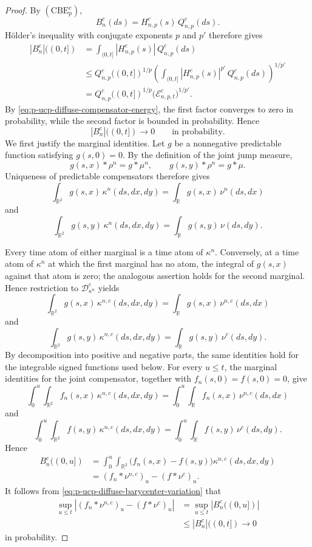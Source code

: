 \documentclass[a4paper,10pt]{article}
\begin{document}
\begin{proof}
By \((\mathrm{CBE}_p^c)\),
\[
        B_n^c(ds)
        =
        H_{n,p}^c(s)\,Q_{n,p}^c(ds).
\]
Hölder's inequality with conjugate exponents \(p\) and \(p'\)
therefore gives
\[
\begin{aligned}
|B_n^c|((0,t])
&=
\int_{(0,t]}
|H_{n,p}^c(s)|\,Q_{n,p}^c(ds)
\\
&\le
Q_{n,p}^c((0,t])^{1/p}
\left(
\int_{(0,t]}
|H_{n,p}^c(s)|^{p'}\,Q_{n,p}^c(ds)
\right)^{1/p'}
\\
&=
Q_{n,p}^c((0,t])^{1/p}
\bigl(\mathcal E_{n,p,t}^c\bigr)^{1/p'}.
\end{aligned}
\]
By \eqref{eq:p-ucp-diffuse-compensator-energy}, the first factor
converges to zero in probability, while the second factor is
bounded in probability. Hence
\begin{equation}
\label{eq:p-ucp-diffuse-barycenter-variation}
        |B_n^c|((0,t])
        \longrightarrow0
        \qquad\text{in probability}.
\end{equation}
We first justify the marginal identities. Let \(g\) be a nonnegative
predictable function satisfying \(g(s,0)=0\). By the definition of the
joint jump measure,
\[
        g(s,x)*\rho^n=g*\mu^n,
        \qquad
        g(s,y)*\rho^n=g*\mu.
\]
Uniqueness of predictable compensators therefore gives
\[
\int_{\mathbb R^2}g(s,x)\,\kappa^n(ds,dx,dy)
=
\int_{\mathbb R}g(s,x)\,\nu^n(ds,dx)
\]
and
\[
\int_{\mathbb R^2}g(s,y)\,\kappa^n(ds,dx,dy)
=
\int_{\mathbb R}g(s,y)\,\nu(ds,dy).
\]

Every time atom of either marginal is a time atom of \(\kappa^n\).
Conversely, at a time atom of \(\kappa^n\) at which the first marginal
has no atom, the integral of \(g(s,x)\) against that atom is zero;
the analogous assertion holds for the second marginal. Hence
restriction to \(\mathcal D_{\kappa^n}^c\) yields
\[
\int_{\mathbb R^2}g(s,x)\,\kappa^{n,c}(ds,dx,dy)
=
\int_{\mathbb R}g(s,x)\,\nu^{n,c}(ds,dx)
\]
and
\[
\int_{\mathbb R^2}g(s,y)\,\kappa^{n,c}(ds,dx,dy)
=
\int_{\mathbb R}g(s,y)\,\nu^c(ds,dy).
\]
By decomposition into positive and negative parts, the same identities
hold for the integrable signed functions used below.
For every \(u\le t\), the marginal identities for the joint
compensator, together with \(f_n(s,0)=f(s,0)=0\), give
\[
\int_0^u\int_{\mathbb R^2}
f_n(s,x)\,\kappa^{n,c}(ds,dx,dy)
=
\int_0^u\int_{\mathbb R}
f_n(s,x)\,\nu^{n,c}(ds,dx)
\]
and
\[
\int_0^u\int_{\mathbb R^2}
f(s,y)\,\kappa^{n,c}(ds,dx,dy)
=
\int_0^u\int_{\mathbb R}
f(s,y)\,\nu^c(ds,dy).
\]
Hence
\[
\begin{aligned}
B_n^c((0,u])
&=
\int_0^u\int_{\mathbb R^2}
\bigl(f_n(s,x)-f(s,y)\bigr)
\kappa^{n,c}(ds,dx,dy)
\\
&=
(f_n*\nu^{n,c})_u-(f*\nu^c)_u.
\end{aligned}
\]
It follows from \eqref{eq:p-ucp-diffuse-barycenter-variation} that
\begin{equation}
\label{eq:p-ucp-diffuse-level-convergence}
\begin{aligned}
\sup_{u\le t}
\left|
(f_n*\nu^{n,c})_u-(f*\nu^c)_u
\right|
&=
\sup_{u\le t}|B_n^c((0,u])|
\\
&\le
|B_n^c|((0,t])
\longrightarrow0
\end{aligned}
\end{equation}
in probability.


\end{proof}
\end{document}

